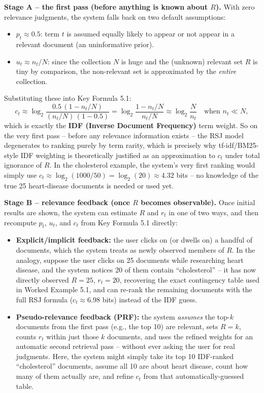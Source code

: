 \documentclass[11pt, a4paper]{article}
\begin{document}
\textbf{Stage A -- the first pass (before anything is known about $R$).} With zero relevance judgments, the system falls back on two default assumptions:
\begin{itemize}
\item $p_t \approx 0.5$: term $t$ is assumed equally likely to appear or not appear in a relevant document (an uninformative prior).
\item $u_t \approx n_t/N$: since the collection $N$ is huge and the (unknown) relevant set $R$ is tiny by comparison, the non-relevant set is approximated by the \emph{entire} collection.
\end{itemize}
Substituting these into Key Formula 5.1:
\[
c_t \approx \log_2 \frac{0.5\,(1-n_t/N)}{(n_t/N)\,(1-0.5)} = \log_2\frac{1-n_t/N}{n_t/N} \approx \log_2\frac{N}{n_t} \quad \text{when } n_t \ll N,
\]
which is exactly the \textbf{IDF (Inverse Document Frequency)} term weight. So on the very first pass -- before any relevance information exists -- the RSJ model degenerates to ranking purely by term rarity, which is precisely why tf-idf/BM25-style IDF weighting is theoretically justified as an approximation to $c_t$ under total ignorance of $R$. In the cholesterol example, the system's very first ranking would simply use $c_t \approx \log_2(1000/50) = \log_2(20) \approx 4.32$ bits -- no knowledge of the true 25 heart-disease documents is needed or used yet.

\textbf{Stage B -- relevance feedback (once $R$ becomes observable).} Once initial results are shown, the system can estimate $R$ and $r_t$ in one of two ways, and then recompute $p_t$, $u_t$, and $c_t$ from Key Formula 5.1 directly:
\begin{itemize}
\item \textbf{Explicit/implicit feedback:} the user clicks on (or dwells on) a handful of documents, which the system treats as newly observed members of $R$. In the analogy, suppose the user clicks on 25 documents while researching heart disease, and the system notices 20 of them contain ``cholesterol'' -- it has now directly observed $R=25$, $r_t=20$, recovering the exact contingency table used in Worked Example 5.1, and can re-rank the remaining documents with the full RSJ formula ($c_t\approx6.98$ bits) instead of the IDF guess.
\item \textbf{Pseudo-relevance feedback (PRF):} the system \emph{assumes} the top-$k$ documents from the first pass (e.g., the top 10) are relevant, sets $R=k$, counts $r_t$ within just those $k$ documents, and uses the refined weights for an automatic second retrieval pass -- without ever asking the user for real judgments. Here, the system might simply take its top 10 IDF-ranked ``cholesterol'' documents, assume all 10 are about heart disease, count how many of them actually are, and refine $c_t$ from that automatically-guessed table.
\end{itemize}
\end{document}
